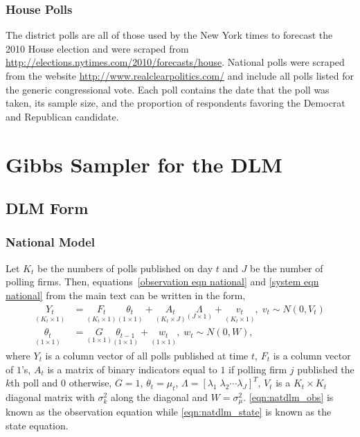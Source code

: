 \documentclass[12pt,final,fleqn]{article}
\theoremstyle{plain}
\begin{document}
\subsubsection{House Polls}
The district polls are all of those used by the New York times to forecast the 2010 House election and  were scraped from \url{http://elections.nytimes.com/2010/forecasts/house}. National polls were scraped from the website \url{http://www.realclearpolitics.com/} and include all polls listed for the generic congressional vote. Each poll contains the date that the poll was taken, its sample size, and the proportion of respondents favoring the Democrat and Republican candidate. 

\section{Gibbs Sampler for the DLM} \label{sec:gibbs}
\subsection{DLM Form} \label{sec: DLM Form}
\subsubsection{National Model} 
Let $K_t$ be the numbers of polls published on day $t$ and $J$ be the number of polling firms. Then, equations~\ref*{observation eqn national} and \ref*{system eqn national} from the main text can be written in the form,
\begin{align}
\label{eqn:natdlm_obs}
\underset{(K_t \times 1)}{Y_t} &= \underset{(K_t \times 1)}{F_t} \underset{(1 \times 1)}{\theta_t} + \underset{(K_t \times J)}{A_t} \underset{(J \times 1)}{\Lambda} + \underset{(K_t \times 1)}{v_t},\; v_t \sim N(0, V_t)\\
\label{eqn:natdlm_state}
\underset{(1 \times 1)}{\theta_t} &= \underset{(1 \times 1)}{G}\underset{(1 \times 1)}{\theta_{t-1}} + \underset{(1 \times 1)}{w_t},\; w_t \sim N(0, W),
\end{align}
where $Y_t$ is a column vector of all polls published at time $t$, $F_t$ is a column vector of $1$'s, $A_t$ is a matrix of binary indicators equal to $1$ if polling firm $j$ published the $k$th poll and $0$ otherwise, $G=1$, $\theta_t = \mu_t$, $\Lambda =[\lambda_1\; \lambda_2\cdots \lambda_J]^T$,  $V_t$ is a $K_t \times K_t$ diagonal matrix with $\sigma^2_k$ along the diagonal and $W=\sigma^2_\mu$. \autoref{eqn:natdlm_obs} is known as the observation equation while \autoref{eqn:natdlm_state} is known as the state equation. 
\end{document}
